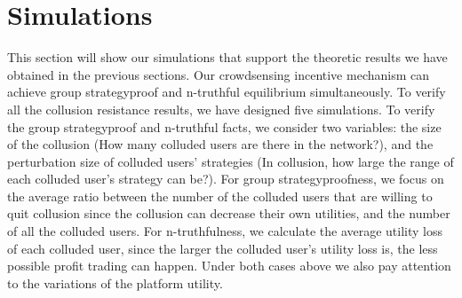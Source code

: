 \documentclass[conference]{IEEEtran}
\theoremstyle{definition}
\begin{document}
\section{Simulations}
\label{sec:sim}
This section will show our simulations that support the theoretic results we have obtained in the previous sections. Our crowdsensing incentive mechanism can achieve group strategyproof and n-truthful equilibrium simultaneously. 
To verify all the collusion resistance results, we have designed five simulations. To verify the group strategyproof and n-truthful facts, we consider two variables: the size of the collusion (How many colluded users are there in the network?), and the perturbation size of colluded users' strategies (In collusion, how large the range of each colluded user's strategy can be?). For group strategyproofness, we focus on the average ratio between the number of the colluded users that are willing to quit collusion since the collusion can decrease their own utilities, and the number of all the colluded users. For n-truthfulness, we calculate the average utility loss of each colluded user, since the larger the colluded user's utility loss is, the less possible profit trading can happen. Under both cases above we also pay attention to the variations of the platform utility. %
\end{document}
